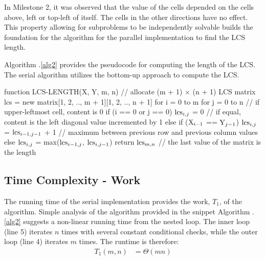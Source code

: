 \documentclass[usletter, 11pt]{extarticle}
\newcommand{\V}[1]{\textup{#1}}
\newcommand{\lcs}{\V{lcs}}
\newcommand{\seqone}{\V{X}}
\newcommand{\seqtwo}{\V{Y}}
\begin{document}
    \vspace{-0.5in}
    In Milestone 2, it was observed that the value of the cells depended on the
    cells above, left or top-left of itself. The cells in the other directions
    have no effect. This property allowing for subproblems to be independently
    solvable builds the foundation for the algorithm for the parallel
    implementation to find the LCS length.

    Algorithm \thesection .\ref{alg2} provides the pseudocode for
    computing the length of the LCS. The serial algorithm utilizes the bottom-up approach to compute the LCS.

\newpage
\begin{pseudocode}[caption={Serial Longest Common Subsequence Length},
label={alg2}]
function LCS-LENGTH(X, Y, m, n)
    // allocate (m + 1) $\times$ (n + 1) LCS matrix
    lcs = new matrix[1, 2, .., m + 1][1, 2, .., n + 1]
    for i = 0 to m
        for j = 0 to n
            // if upper-leftmost cell, content is 0
            if (i == 0 or j == 0)
                $\lcs_{i, j}$ = 0
            // if equal, content is the left diagonal value incremented by 1
            else if ($\seqone_{i - 1}$ == $\seqtwo_{j - 1}$)
                $\lcs_{i, j}$ = $\lcs_{i-1, j-1}$ + 1  
            // maximum between previous row and previous column values
            else
                $\lcs_{i, j}$ = max($\lcs_{i-1, j}$, $\lcs_{i, j-1}$)
    return $\lcs_{m,n}$  // the last value of the matrix is the length

\end{pseudocode}

        \subsection{Time Complexity - Work} The running time of the serial
        implementation provides the work, $T_{1}$, of the algorithm. Simple
        analysis of the algorithm provided in the snippet Algorithm \thesection
        .\ref{alg2} suggests a non-linear running time from the nested loop.
        The inner loop (line 5) iterates $n$ times with several constant
        conditional checks, while the outer loop (line 4) iterates $m$ times.
        The runtime is therefore:
        \begin{equation*}
            \begin{split}
                T_1(m, n) & = \Theta(mn) \\
            \end{split}
        \end{equation*}
\end{document}

